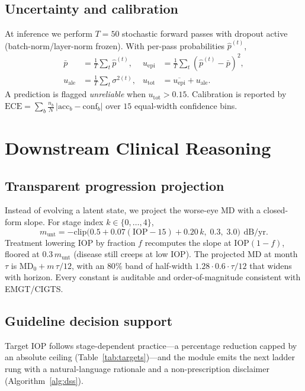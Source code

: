 \documentclass[10pt,twocolumn]{article}
\newcommand{\db}{\,\text{dB}}
\begin{document}
\subsection{Uncertainty and calibration}
At inference we perform $T{=}50$ stochastic forward passes with dropout active
(batch-norm/layer-norm frozen). With per-pass probabilities $\hat{p}^{(t)}$,
\begin{align}
\bar{p} &= \tfrac{1}{T}\textstyle\sum_t \hat{p}^{(t)}, &
u_{\text{epi}} &= \tfrac{1}{T}\textstyle\sum_t (\hat{p}^{(t)}-\bar{p})^2,\\
u_{\text{ale}} &= \tfrac{1}{T}\textstyle\sum_t \sigma^{2(t)}, &
u_{\text{tot}} &= \overline{u_{\text{epi}}} + u_{\text{ale}}.
\end{align}
A prediction is flagged \emph{unreliable} when $u_{\text{tot}}>0.15$. Calibration is
reported by $\mathrm{ECE}=\sum_b \frac{n_b}{N}\,|\mathrm{acc}_b-\mathrm{conf}_b|$
over $15$ equal-width confidence bins.

\section{Downstream Clinical Reasoning}
\label{sec:downstream}

\subsection{Transparent progression projection}
Instead of evolving a latent state, we project the worse-eye MD with a closed-form
slope. For stage index $k\in\{0,\dots,4\}$,
\begin{equation}
m_{\text{unt}} = -\mathrm{clip}\!\big(0.5 + 0.07(\mathrm{IOP}-15) + 0.20\,k,\;0.3,\;3.0\big)\ \db/\text{yr}.
\end{equation}
Treatment lowering IOP by fraction $f$ recomputes the slope at $\mathrm{IOP}(1{-}f)$,
floored at $0.3\,m_{\text{unt}}$ (disease still creeps at low IOP). The projected MD
at month $\tau$ is $\mathrm{MD}_0+m\,\tau/12$, with an $80\%$ band of half-width
$1.28\cdot0.6\cdot\tau/12$ that widens with horizon. Every constant is auditable and
order-of-magnitude consistent with EMGT/CIGTS.

\subsection{Guideline decision support}
Target IOP follows stage-dependent practice---a percentage reduction capped by an
absolute ceiling (Table~\ref{tab:targets})---and the module emits the next ladder
rung with a natural-language rationale and a non-prescription disclaimer
(Algorithm~\ref{alg:dss}).
\end{document}

